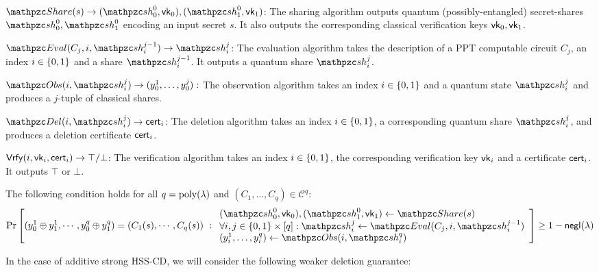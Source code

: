 \begin{description}

\item [Syntax:] $ $
\item $\Sh(s) \rightarrow (\qsh_0^0, \vk_0), (\qsh_1^0,
\vk_1)$: The sharing algorithm outputs quantum
(possibly-entangled) secret-shares $\qsh_0^0, \qsh_1^0$ encoding an
input secret $s$. It also outputs the corresponding classical
verification keys $\mathsf{vk}_0, \mathsf{vk}_1$.

\item $\Ev(C_j, i, \qsh_i^{j-1}) \rightarrow \qsh_i^{j}$: The
evaluation algorithm takes the description of a PPT computable
circuit $C_j$, an index $i \in \{0,1\}$ and a share
$\qsh_i^{j-1}$. It outputs a quantum share $\qsh_i^j$.

\item $\Obs(i, \qsh_i^j) \rightarrow (y_0^1, \ldots, y_0^j):$ The
observation algorithm takes an index $i \in \{0,1\}$ and a quantum
state $\qsh_i^j$ and produces a $j$-tuple of classical shares.

\item $\Del(i, \qsh_i^j) \rightarrow \cert_i$: The deletion
algorithm takes an index $i \in \{0,1\}$, a corresponding quantum share
$\qsh_i^j$, and produces a deletion certificate $\mathsf{cert}_i$.

\item $\mathsf{Vrfy}(i, \mathsf{vk}_i, \mathsf{cert}_i) \rightarrow \top/\bot$: The
verification algorithm takes an index $i \in \{0,1\}$, the
corresponding verification key $\mathsf{vk}_i$ and a certificate $\mathsf{cert}_i$.
It outputs $\top$ or $\bot$.

\item [Evaluation Correctness:] The following
condition holds for all $q = {\mathrm{poly}}(\lambda)$ and $(C_1, \ldots, C_q)
\in \mathcal{C}^q$:
\begin{align}
\Pr\left[
(y_0^1 \xor y_1^1, \cdots, y_0^q \xor y_1^q) = (C_1(s), \cdots,
C_q(s))
\ :
\begin{array}{ll}
(\qsh_0^0, \vk_0), (\qsh_1^0, \vk_1) \gets \Sh(s)\\
\forall i,j \in \bit \times [q]: \qsh_i^j
\leftarrow \Ev(C_j, i,
\qsh_i^{j-1})\\
(y_i^1, \ldots, y_i^q) \leftarrow \Obs(i, \qsh_i^q)
\end{array}
\right] \geq 1 - \negl(\secp)
\end{align}

In the case of additive strong HSS-CD, we will consider the
following weaker deletion guarantee: 


\end{description}
